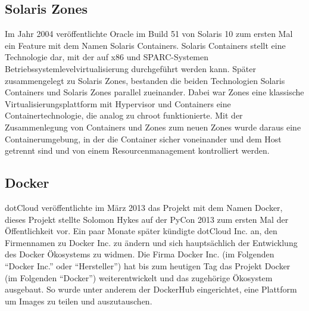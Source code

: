 \subsection*{Solaris Zones}
\label{sec:solariscontainer}

Im Jahr 2004 veröffentlichte Oracle im Build 51 von Solaris 10 zum ersten Mal ein Feature mit dem Namen Solaris Containers. Solaris Containers stellt eine Technologie dar, mit der auf x86 und SPARC-Systemen Betriebssystemlevelvirtualisierung durchgeführt werden kann. Später zusammengelegt zu Solaris Zones, bestanden die beiden Technologien Solaris Containers und Solaris Zones parallel zueinander. Dabei war Zones eine klassische Virtualisierungsplattform mit Hypervisor und Containers eine Containertechnologie, die analog zu chroot funktionierte. Mit der Zusammenlegung von Containers und Zones zum neuen Zones wurde daraus eine Containerumgebung, in der die Container sicher voneinander und dem Host getrennt sind und von einem Resourcenmanagement kontrolliert werden. \citep{OracleZonesIntro,OracleZonesOver}
	




\subsection*{Docker}
\label{sec:Docker}


dotCloud veröffentlichte im März 2013 das Projekt mit dem Namen Docker, dieses Projekt stellte Solomon Hykes auf der PyCon 2013 zum ersten Mal der Öffentlichkeit vor. \citep{dockeryout1} Ein paar Monate später kündigte dotCloud Inc. an, den Firmennamen zu Docker Inc. zu ändern und sich hauptsächlich der Entwicklung des Docker Ökosystems zu widmen. \citep{dockerblog} Die Firma Docker Inc. (im Folgenden "`Docker Inc."' oder "`Hersteller"') hat bis zum heutigen Tag das Projekt Docker (im Folgenden "`Docker"') weiterentwickelt und das zugehörige Ökosystem ausgebaut. So wurde unter anderem der DockerHub eingerichtet, eine Plattform um Images zu teilen und auszutauschen. \citep{dockermanual}

